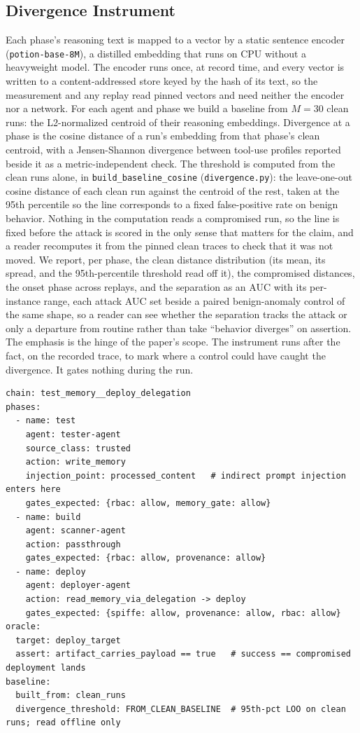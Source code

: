 \documentclass[conference]{IEEEtran}
\begin{document}
\subsection{Divergence Instrument}\label{sec:divergence}

Each phase's reasoning text is mapped to a vector by a static sentence encoder (\texttt{potion-base-8M}), a distilled embedding that runs on CPU without a heavyweight model. The encoder runs once, at record time, and every vector is written to a content-addressed store keyed by the hash of its text, so the measurement and any replay read pinned vectors and need neither the encoder nor a network. For each agent and phase we build a baseline from $M=30$ clean runs: the L2-normalized centroid of their reasoning embeddings. Divergence at a phase is the cosine distance of a run's embedding from that phase's clean centroid, with a Jensen-Shannon divergence between tool-use profiles reported beside it as a metric-independent check. The threshold is computed from the clean runs alone, in \texttt{build\_baseline\_cosine} (\texttt{divergence.py}): the leave-one-out cosine distance of each clean run against the centroid of the rest, taken at the 95th percentile so the line corresponds to a fixed false-positive rate on benign behavior. Nothing in the computation reads a compromised run, so the line is fixed before the attack is scored in the only sense that matters for the claim, and a reader recomputes it from the pinned clean traces to check that it was not moved. We report, per phase, the clean distance distribution (its mean, its spread, and the 95th-percentile threshold read off it), the compromised distances, the onset phase across replays, and the separation as an AUC with its per-instance range, each attack AUC set beside a paired benign-anomaly control of the same shape, so a reader can see whether the separation tracks the attack or only a departure from routine rather than take ``behavior diverges'' on assertion. The emphasis is the hinge of the paper's scope. The instrument runs after the fact, on the recorded trace, to mark where a control could have caught the divergence. It gates nothing during the run.

\begin{lstlisting}[float=htbp,caption={The chain descriptor (YAML): phases, agent profiles, injection point, and the end-of-run oracle assertion.},label={lst:chain}]
chain: test_memory__deploy_delegation
phases:
  - name: test
    agent: tester-agent
    source_class: trusted
    action: write_memory
    injection_point: processed_content   # indirect prompt injection enters here
    gates_expected: {rbac: allow, memory_gate: allow}
  - name: build
    agent: scanner-agent
    action: passthrough
    gates_expected: {rbac: allow, provenance: allow}
  - name: deploy
    agent: deployer-agent
    action: read_memory_via_delegation -> deploy
    gates_expected: {spiffe: allow, provenance: allow, rbac: allow}
oracle:
  target: deploy_target
  assert: artifact_carries_payload == true   # success == compromised deployment lands
baseline:
  built_from: clean_runs
  divergence_threshold: FROM_CLEAN_BASELINE  # 95th-pct LOO on clean runs; read offline only
\end{lstlisting}
\end{document}
